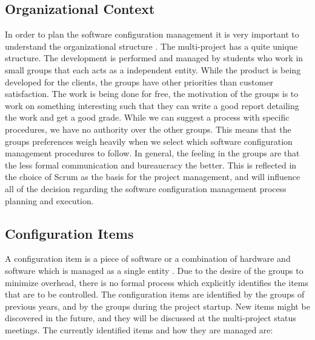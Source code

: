 \subsection{Organizational Context}
In order to plan the software configuration management it is very important to understand the organizational structure \parencite[ch.6]{swebok}. The multi-project has a quite unique structure. The development is performed and managed by students who work in small groups that each acts as a independent entity. While the product is being developed for the clients, the groups have other priorities than customer satisfaction. The work is being done for free, the motivation of the groups is to work on something interesting such that they can write a good report detailing the work and get a good grade. While we can suggest a process with specific procedures, we have no authority over the other groups. This means that the groups preferences weigh heavily when we select which software configuration management procedures to follow. In general, the feeling in the groups are that the less formal communication and bureaucracy the better. This is reflected in the choice of Scrum as the basis for the project management, and will influence all of the decision regarding the software configuration management process planning and execution.

\subsection{Configuration Items}
A configuration item is a piece of software or a combination of hardware and software which is managed as a single entity \parencite[ch.6]{swebok}. Due to the desire of the groups to minimize overhead, there is no formal process which explicitly identifies the items that are to be controlled. The configuration items are identified by the groups of previous years, and by the groups during the project startup. New items might be discovered in the future, and they will be discussed at the multi-project status meetings. The currently identified items and how they are managed are:

